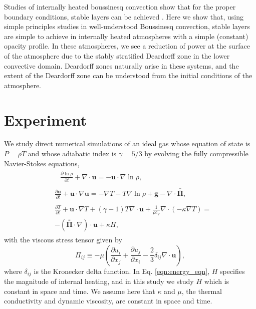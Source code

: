 \documentclass[titlepage, twocolumn, fontsize=10]{aastex6}
\newcommand{\grad}{\ensuremath{\nabla}}
\newcommand{\stressT}{\ensuremath{\bm{\bar{\bar{\Pi}}}}}
\begin{document}
Studies of internally heated boussinesq convection show that for the proper
boundary conditions, stable layers can be achieved \citep{goluskin&vanderpoel2016}.
Here we show that, using simple principles studies in well-understood Boussinesq
convection, stable layers are simple to achieve in internally heated atmospheres
with a simple (constant) opacity profile.  In these atmospheres, we see a reduction
of power at the surface of the atmosphere due to the stably stratified
Deardorff zone in the lower convective domain.  Deardorff zones naturally arise
in these systems, and the extent of the Deardorff zone can be understood from
the initial conditions of the atmosphere.

\section{Experiment} 
We study direct numerical simulations of an ideal gas whose equation of
state is $P = \rho T$ and whose adiabatic index is $\gamma = 5/3$
by evolving the fully compressible Navier-Stokes equations, 
\label{sec:experiment}
\begin{align}
&\begin{aligned}
&\frac{\partial \ln\rho}{\partial t} + \grad\cdot\bm{u} 
    = -\bm{u}\cdot\grad\ln\rho,
	\label{eqn:continuity_eqn}
\end{aligned}\\
&\begin{aligned}
\frac{\partial\bm{u}}{\partial t} + \bm{u}\cdot\grad\bm{u} =
- \grad T - T \grad \ln \rho + \bm{g} - \grad\cdot\stressT,
\label{eqn:momentum_eqn}
\end{aligned}\\
&\begin{aligned}
\frac{\partial T}{\partial t} + \bm{u}\cdot\grad T
+ (\gamma-1)T\grad\cdot\bm{u} + \frac{1}{\rho c_V}
\grad\cdot\left(-\kappa\grad T\right) = \\- (\stressT\cdot\grad)\cdot\bm{u} + \kappa H,
	\label{eqn:energy_eqn}
\end{aligned}
\end{align}
with the viscous stress tensor given by
\begin{equation}
\Pi_{ij} \equiv -\mu\left(\frac{\partial u_i}{\partial x_j} + 
\frac{\partial u_j}{\partial x_i} - \frac{2}{3}\delta_{ij}\grad\cdot\bm{u}\right),
	\label{eqn:stress_tensor}
\end{equation}
where $\delta_{ij}$ is the Kronecker delta function.  In Eq. \ref{eqn:energy_eqn}, $H$
specifies the magnitude of internal heating, and in this study we study $H$ which is
constant in space and time.  We assume here that $\kappa$ and $\mu$, the thermal
conductivity and dynamic viscosity, are constant in space and time.
\end{document}
